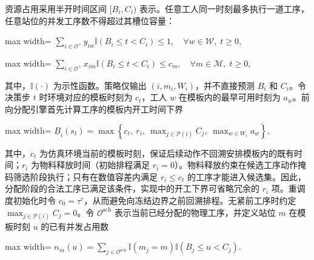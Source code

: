 \documentclass[journal,10pt]{IEEEtran}
\begin{document}
资源占用采用半开时间区间 \([B_i,C_i)\) 表示。任意工人同一时刻最多执行一道工序，任意站位的并发工序数不得超过其槽位容量：

\begin{center}
\begin{adjustbox}{max width=\columnwidth}
$\displaystyle
\sum_{i\in\mathcal{O}^{+}}y_{iw}\mathbb{I}(B_i\le t<C_i)\le1,
\quad \forall w\in\mathcal{W},\;t\ge0,
$
\end{adjustbox}
\end{center}

\begin{center}
\begin{adjustbox}{max width=\columnwidth}
$\displaystyle
\sum_{i\in\mathcal{O}^{+}}x_{im}\mathbb{I}(B_i\le t<C_i)\le c_m,
\quad \forall m\in\mathcal{M},\;t\ge0,
$
\end{adjustbox}
\end{center}

其中，\(\mathbb{I}(\cdot)\) 为示性函数。策略仅输出 \((i,m_i,W_i)\)，并不直接预测 \(B_i\) 和 \(C_i\)。令决策步 \(t\) 时环境对应的模板时刻为 \(c_t\)，工人 \(w\) 在模板内的最早可用时刻为 \(a_w\)。前向分配引擎首先计算工序的模板内开工时间下界

\begin{center}
\begin{adjustbox}{max width=\columnwidth}
$\displaystyle
\underline{B}_i(s_t)=
\max\left\{
c_t,\ r_i,\ \max_{j\in\mathcal P(i)}C_j,\ \max_{w\in W_i}a_w
\right\},
$
\end{adjustbox}
\end{center}

其中，\(c_t\) 为仿真环境当前的模板时刻，保证后续动作不回溯安排模板内的既有时间；\(r_i\) 为物料释放时间（初始排程满足 \(r_i=0\)）。物料释放约束在候选工序动作掩码筛选阶段执行；只有在数值容差内满足 \(r_i\le c_t\) 的工序才能进入候选集。因此，分配阶段的合法工序已满足该条件，实现中的开工下界可省略冗余的 \(r_i\) 项。重调度初始化时令 \(c_0=\tau^r\)，从而避免向冻结边界之前回溯排程。无紧前工序时约定 \(\max_{j\in\mathcal P(i)}C_j=0\)。令 \(\mathcal O^{\mathrm{sch}}\) 表示当前已经分配的物理工序，并定义站位 \(m\) 在模板时刻 \(u\) 的已有并发占用数

\begin{center}
\begin{adjustbox}{max width=\columnwidth}
$\displaystyle
n_m(u)=\sum_{j\in\mathcal O^{\mathrm{sch}}}
\mathbb{I}(m_j=m)\mathbb{I}(B_j\le u<C_j).
$
\end{adjustbox}
\end{center}
\end{document}
